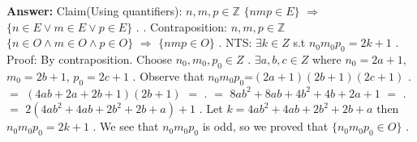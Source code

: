 \documentclass[12pt]{article}
\begin{document}
{\noindent\bf Answer:}
{\noindent
Claim(Using quantifiers): $n,m,p\in\mathbb{Z}$ $\{nmp\in E\}$ $\Rightarrow$ $\{n \in E \lor m \in E \lor p \in E\}$ .\newline
.\newline
Contraposition: $n,m,p\in\mathbb{Z}$  $\{n \in O \land m \in O \land p \in O\}$ $\Rightarrow$  $\{nmp\in O\}$ \newline
.\newline
NTS:  $\exists k \in Z$ s.t $n_{0}m_{0}p_{0}=2k+1 $\newline
.\newline
Proof: By contraposition. Choose $n_{0},m_{0},p_{0} \in Z $ \newline
.\newline
$\exists a,b,c \in Z$ where $n_{0}=2a+1$, $m_{0}=2b+1$, $p_{0}=2c+1$\newline
.\newline
Observe that  $n_{0}m_{0}p_{0}$=$(2a+1)(2b+1)(2c+1)$ \newline
.\newline
              $=$ $(4ab+2a+2b+1)(2b+1) $ $=$\newline
.\newline
              $=$ $8ab^{2}+8ab+4b^{2}+4b+2a+1$ $=$\newline
.\newline
              $=$ $2(4ab^{2}+4ab+2b^{2}+2b+a)+1$\newline
.\newline
Let $k=4ab^{2}+4ab+2b^{2}+2b+a $ then $n_{0}m_{0}p_{0}=2k+1$\newline
.\newline
We see that $n_{0}m_{0}p_{0}$ is odd, so we proved that $\{n_{0}m_{0}p_{0}\in O\}$\newline
.\newline
}
\end{document}
